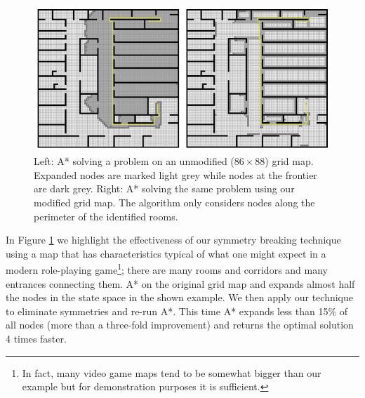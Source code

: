 \begin{figure}[t]
\centering
	    \includegraphics[width=0.95\columnwidth, trim = 10mm 10mm 10mm 0mm]{diagrams/oha_contrast.png}
		\caption{Left: A* solving a problem on an unmodified ($86\times88$) grid map. 
		Expanded nodes are marked light grey while nodes at the frontier are dark grey.
		Right: A* solving the same problem using our modified grid map. 
		The algorithm only considers nodes along the perimeter of the identified rooms.}
	\label{fig-contrast}
\end{figure}

In Figure \ref{fig-contrast} we highlight the effectiveness of our symmetry breaking technique using
a map that has characteristics typical of what one might expect in a modern role-playing game\footnote{
In fact, many video game maps tend to be somewhat bigger than our example but for demonstration 
purposes it is sufficient.};
there are many rooms and corridors and many entrances connecting them.
A* on the original grid map and expands almost half the nodes
in the state space in the shown example.
We then apply our technique to eliminate symmetries and re-run A*.
This time A* expands less than 15\% of all nodes (more than a three-fold improvement) and returns the 
optimal solution 4 times faster.
